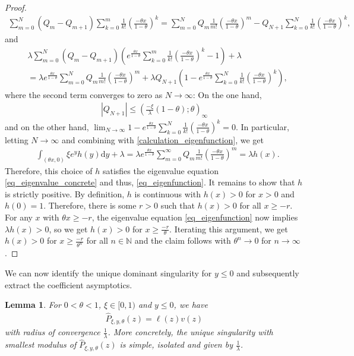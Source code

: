\documentclass[10pt,a4paper]{amsart}
\newcommand{\N}{\mathbb{N}} %
\newcommand{\1}{\mathds{1}}
\renewcommand{\d}{\mathrm{d}}
\newtheorem{Lemma}[definition]{Lemma}
\begin{document}
\begin{proof}
\begin{align*}
    \sum_{m=0}^N \left(Q_{m}-Q_{m+1}\right)\sum_{k=0}^m\frac{1}{k!}\left(\frac{-\theta x}{1-\theta}\right)^k
    =\sum_{m=0}^NQ_m\frac{1}{m!}\left(\frac{-\theta x}{1-\theta}\right)^m-Q_{N+1}\sum_{k=0}^{N}\frac{1}{k!}\left(\frac{-\theta x}{1-\theta}\right)^k,
\end{align*}
and
\begin{align*}
    &\lambda\sum_{m=0}^N \left(Q_{m}-Q_{m+1}\right)\left(e^{\frac{\theta x}{1-\theta}}\sum_{k=0}^m\frac{1}{k!}\left(\frac{-\theta x}{1-\theta}\right)^k-1\right)+\lambda
   \\&=\lambda e^{\frac{\theta x}{1-\theta}}\sum_{m=0}^NQ_m\frac{1}{m!}\left(\frac{-\theta x}{1-\theta}\right)^m+\lambda Q_{N+1}\left(1-e^{\frac{\theta x}{1-\theta}}\sum_{k=0}^{N}\frac{1}{k!}\left(\frac{-\theta x}{1-\theta}\right)^k\right),
\end{align*}
where the second term converges to zero as $N\to\infty$: On the one hand, 
\begin{align*}
    |Q_{N+1}|\le \left(\frac{-\xi}{\lambda}(1-\theta);\theta\right)_\infty
\end{align*}
and on the other hand, $\lim_{N\to\infty} 1-e^{\frac{\theta x}{1-\theta}}\sum_{k=0}^{N}\frac{1}{k!}\left(\frac{-\theta x}{1-\theta}\right)^k=0$. In particular, letting $N\to\infty$ and combining with \eqref{calculation_eigenfunction}, we get
\begin{align*}
    &\int_{(\theta x,0)}\xi  e^yh(y)\d y+\lambda
    =\lambda e^{\frac{\theta x}{1-\theta}}\sum_{m=0}^\infty Q_m\frac{1}{m!}\left(\frac{-\theta x}{1-\theta}\right)^m
    =\lambda h(x).
\end{align*}
Therefore, this choice of $h$ satisfies the eigenvalue equation \eqref{eq_eigenvalue_concrete} and thus, \eqref{eq_eigenfunction}. It remains to show that $h$ is strictly positive. By definition, $h$ is continuous with $h(x)>0$ for $x>0$ and $h(0)=1$. Therefore, there is some $r>0$ such that $h(x)>0$ for all $x\ge-r$. For any $x$ with $\theta x\ge -r$, the eigenvalue equation \eqref{eq_eigenfunction} now implies $\lambda h(x)>0$, so we get $h(x)>0$ for $x\ge\frac{-r}{\theta}$. Iterating this argument, we get $h(x)>0$ for $x\ge\frac{-r}{\theta^n}$ for all $n\in\N$ and the claim follows with $\theta^n\to0$ for $n\to\infty$.
\end{proof}
We can now identify the unique dominant singularity for $y\leq 0$ and subsequently extract the coefficient asymptotics.
\begin{Lemma}\label{gf_pos_theta_le1}
  For $0<\theta<1$, $\xi\in[0,1)$ and $y\le 0$, we have
    \begin{align*}
      \hat{P}_{\xi,y,\theta}(z)= \ell(z)v(z)
    \end{align*}
    with radius of convergence $\frac{1}{\lambda}$. More concretely, the unique singularity with smallest modulus of $\hat{P}_{\xi,y,\theta}(z)$ is simple, isolated and given by $\frac{1}{\lambda}$.
\end{Lemma}
\end{document}
